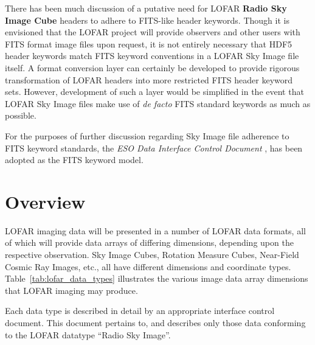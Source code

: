 \documentclass[a4paper,10pt,bibtotoc]{scrartcl}
\begin{document}
There has been much discussion of a putative need for LOFAR
\textbf{Radio Sky Image Cube} headers to adhere to FITS-like header
keywords. Though it is envisioned that the LOFAR project will provide observers and other
users with FITS format image files upon request, it is not entirely
necessary that HDF5 header keywords match FITS keyword conventions in
a LOFAR Sky Image file itself. A format conversion layer can
certainly be developed to provide rigorous transformation of LOFAR
headers into more restricted FITS header keyword sets. However,
development of such a layer would be simplified in the event that
LOFAR Sky Image files make use of \textit{de facto} FITS standard
keywords as much as possible.

For the purposes of further discussion regarding Sky Image file
adherence to FITS keyword standards, the \textsl{ESO Data Interface
 Control Document} \cite{eso.dic}, has been adopted as the FITS
keyword model.

\section{Overview}
\label{sec:overview}

LOFAR imaging data will be presented in a number of LOFAR data formats, all of
which will provide data arrays of differing dimensions, depending upon the
respective observation. Sky Image Cubes, Rotation Measure Cubes, Near-Field
Cosmic Ray Images, etc., all have different dimensions and coordinate types.
Table~\ref{tab:lofar_data_types} illustrates the various image data array
dimensions that LOFAR imaging may produce.



Each data type is described in detail by an appropriate interface
control document. This document pertains to, and describes only those
data conforming to the LOFAR datatype ``Radio Sky Image''.
\end{document}
